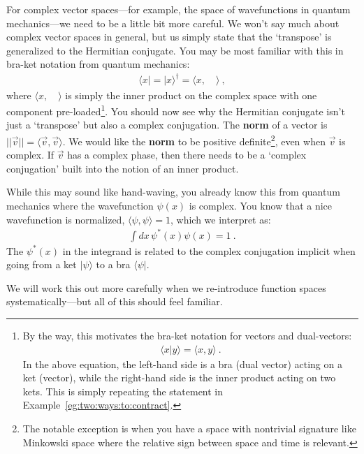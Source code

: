 For complex vector spaces---for example, the space of wavefunctions in quantum mechanics---we need to be a little bit more careful. We won't say much about complex vector spaces in general, but us simply state that the `transpose’ is generalized to the Hermitian conjugate. You may be most familiar with this in bra-ket notation from quantum mechanics:
\begin{align}
  \langle x| = |x\rangle^\dag = \langle x, \quad \rangle \ ,
\end{align}
where $\langle x, \quad \rangle$ is simply the inner product on the complex space with one component pre-loaded\footnote{By the way, this motivates the bra-ket notation for vectors and dual-vectors:
\begin{align}
  \langle x | y\rangle  = \langle x, y\rangle \ .
\end{align}
In the above equation, the left-hand side is a bra (dual vector) acting on a ket (vector), while the right-hand side is the inner product acting on two kets. This is simply repeating the statement in Example~\ref{eg:two:ways:to:contract}. }. You should now see why the Hermitian conjugate isn't just a `transpose' but also a complex conjugation. The \textbf{norm} of a vector is $||\vec v || = \langle \vec{v},\vec{v}\rangle$. We would like the \textbf{norm} to be positive definite\footnote{The notable exception is when you have a space with nontrivial signature like Minkowski space where the relative sign between space and time is relevant.}, even when $\vec v$ is complex. If $\vec v$ has a complex phase, then there needs to be a `complex conjugation' built into the notion of an inner product. 
\begin{example}
While this may sound like hand-waving, you already know this from quantum mechanics where the wavefunction $\psi(x)$ is complex. You know that a nice wavefunction is normalized, $\langle \psi,\psi\rangle = 1$, which we interpret as:
\begin{align}
  \int dx\, \psi^*(x)\psi(x) = 1 \ .
\end{align}
The $\psi^*(x)$ in the integrand is related to the complex conjugation implicit when going from a ket $|\psi\rangle$ to a bra $\langle \psi|$. 
\end{example}
We will work this out more carefully when we re-introduce function spaces systematically---but all of this should feel familiar. 

